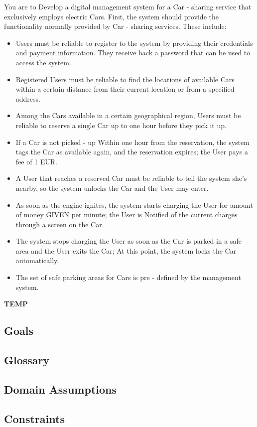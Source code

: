 \documentclass[a4paper]{article}
\begin{document}
You are to Develop a digital management system for a Car - sharing service that exclusively employs electric Cars. First, the system should provide the functionality normally provided by Car - sharing services. These include:
\begin {itemize}
	\item Users must be reliable to register to the system by providing their credentials and payment information. They receive back a password that can be used to access the system.
	\item  Registered Users must be reliable to find the locations of available Cars within a certain distance from their current location or from a specified address.
	\item  Among the Cars available in a certain geographical region, Users must be reliable to reserve a single Car up to one hour before they pick it up.
	\item  If a Car is not picked - up Within one hour from the reservation, the system tags the Car as available again, and the reservation expires; the User pays a fee of 1 EUR.
	\item  A User that reaches a reserved Car must be reliable to tell the system she's nearby, so the system unlocks the Car and the User may enter.
	\item  As soon as the engine ignites, the system starts charging the User for amount of money GIVEN per minute; the User is Notified of the current charges through a screen on the Car.
	\item  The system stops charging the User as soon as the Car is parked in a safe area and the User exits the Car; At this point, the system locks the Car automatically.
	\item  The set of safe parking areas for Cars is pre - defined by the management system.
\end{itemize}

\textbf{TEMP}

\subsection{Goals}
\subsection{Glossary}
\subsection{Domain Assumptions}
\subsection{Constraints}
\end{document}
